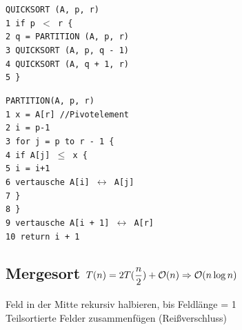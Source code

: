 \documentclass[fs, footer]{latex4ei}
\renewcommand{\t}{\texttt}
\begin{document}
\begin{multicols*}{4}
{{\parbox{4cm}{
\t{QUICKSORT (A, p, r)\\
1\ if p $<$ r \{\\
2\ \quad q = PARTITION (A, p, r)\\
3\ \quad QUICKSORT (A, p, q - 1)\\
4\ \quad QUICKSORT (A, q + 1, r)\\
5\ \}
}}\hspace{-.5cm}
\parbox{4cm}{
\t{PARTITION(A, p, r)\\
1\ x = A[r] //Pivotelement\\
2\ i = p-1 \\
3\ for j = p to r - 1 \{\\
4\ \quad if A[j] $\le$ x \{\\
5\ \qquad i = i+1\\
6\ \qquad vertausche A[i] $\leftrightarrow$ A[j]\\
7\ \quad \}\\
8\ \}\\
9\ vertausche A[i + 1] $\leftrightarrow$ A[r]\\
10\ return i + 1\\}}

\subsection{Mergesort $T(n) = 2T(\dfrac{n}{2}) + \operatorname{\mathcal O}(n) \Rightarrow \operatorname{\mathcal O}(n\log n)$}
Feld in der Mitte rekursiv halbieren, bis Feldlänge = 1\\
Teilsortierte Felder zusammenfügen (Reißverschluss)\\

}}
\end{multicols*}
\end{document}

